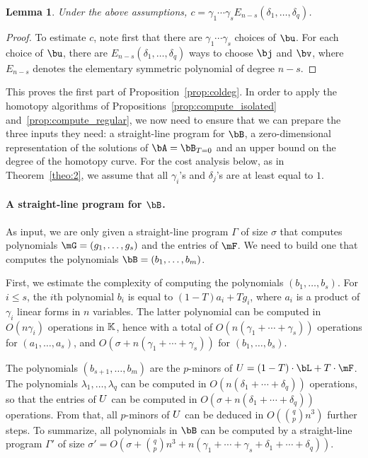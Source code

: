 \documentclass[12pt]{article}
\newtheorem{lemma}[definition]{Lemma}
\begin{document}
\begin{lemma}\label{lemma:column:c_estimate}
  Under the above assumptions, $c=\gamma_1\cdots \gamma_s
  E_{n-s}(\delta_1, \ldots, \delta_q)$.
\end{lemma}
\begin{proof}
  To estimate $c$, note first that there are $\gamma_1\cdots
  \gamma_s$ choices of $\bu$. For each choice of $\bu$, there are
  $E_{n-s}(\delta_1, \ldots, \delta_q)$ ways to
  choose $\bj$ and $\bv$, where $E_{n-s}$ denotes the elementary
  symmetric polynomial of degree $n-s$.   
\end{proof}
This proves the first part of Proposition~\ref{prop:coldeg}.  In order
to apply the homotopy algorithms of Propositions~\ref{prop:compute_isolated}
and~\ref{prop:compute_regular}, we now need to ensure that we can
prepare the three inputs they need: a straight-line program for $\bB$,
a zero-dimensional representation of the solutions of $\bA=\bB_{T=0}$ and an upper
bound on the degree of the homotopy curve. For the cost analysis
below, as in Theorem~\ref{theo:2}, we assume that all $\gamma_i$'s and
$\delta_j$'s are at least equal to $1$.

\paragraph{A straight-line program for $\bB$.} 
As input, we are only given a straight-line program $\Gamma$ of size
$\sigma$ that computes polynomials $\mG=(g_1,\dots,g_s)$ and the entries
of $\mF$. We need to build one that computes the polynomials
$\bB=(b_1,\dots,b_m)$.

First, we estimate the complexity of computing the polynomials
$(b_1,\dots,b_s)$. For $i \le s$, the $i$th polynomial $b_i$ is equal
to $(1-T)a_i + T g_i$, where $a_i$ is a product of $\gamma_i$ linear
forms in $n$ variables. The latter polynomial can be computed in $O(n
\gamma_i)$ operations in $\mathbb{K}$, hence with a total of $O(n
(\gamma_1+\cdots+\gamma_s))$ operations for $(a_1,\dots,a_s)$, and
$O(\sigma+n (\gamma_1+\cdots+\gamma_s))$ for $(b_1,\dots,b_s)$.

The polynomials $(b_{s+1},\dots,b_m)$ are the $p$-minors of
$\mU=(1-T)\cdot\bL+T\cdot\mF$.  The polynomials $\lambda_1,\dots,\lambda_q$ can
be computed in $O(n (\delta_1+\cdots+\delta_q))$ operations, so that
the entries of ${U}$ can be computed in $O(\sigma +
n(\delta_1+\cdots+\delta_q))$ operations. From that, all $p$-minors of
${U}$ can be deduced in $O({q \choose p} n^3)$ further steps.  To
summarize, all polynomials in $\bB$ can be computed by a straight-line
program $\Gamma'$ of size $\sigma'=O(\sigma + {q \choose p} n^3 +n(\gamma_1+\cdots+\gamma_s+\delta_1+\cdots+\delta_q))$.
\end{document}
